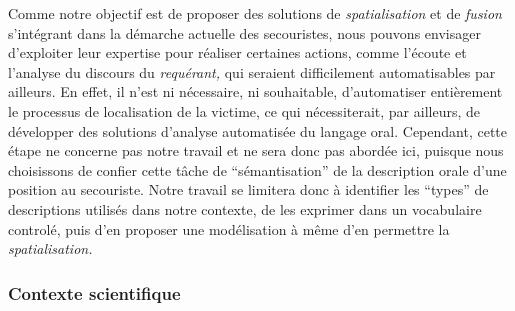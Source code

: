 Comme notre objectif est de proposer des solutions de
\emph{spatialisation} et de \emph{fusion} s'intégrant dans la démarche
actuelle des secouristes, nous pouvons envisager d'exploiter leur
expertise pour réaliser certaines actions, comme l'écoute et l'analyse
du discours du \emph{requérant,} qui seraient difficilement
automatisables par ailleurs. En effet, il n'est ni nécessaire, ni
souhaitable, d'automatiser entièrement le processus de localisation de
la victime, ce qui nécessiterait, par ailleurs, de développer des
solutions d'analyse automatisée du langage oral. Cependant, cette
étape ne concerne pas notre travail et ne sera donc pas abordée ici,
puisque nous choisissons de confier cette tâche de
\enquote{sémantisation} de la description orale d'une position au
secouriste. Notre travail se limitera donc à identifier les
\enquote{types} de descriptions utilisés dans notre contexte, de les
exprimer dans un vocabulaire controlé, puis d'en proposer une
modélisation à même d'en permettre la \emph{spatialisation.}

\subsubsection{Contexte scientifique}

